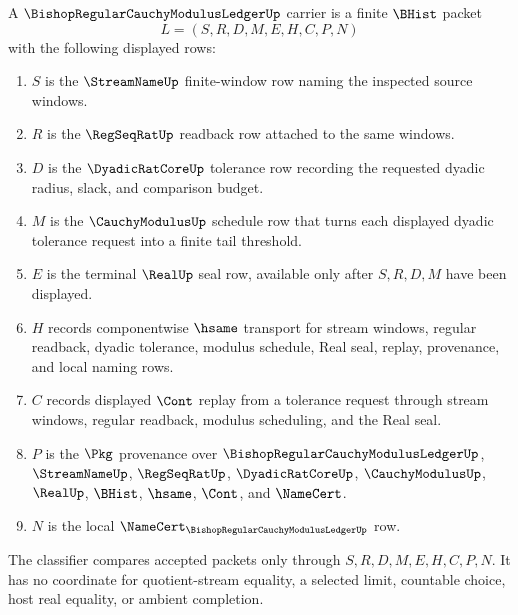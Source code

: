 \begin{definition}
\label{def:bishop-regular-cauchy-modulus-ledger-carrier}
A $\BishopRegularCauchyModulusLedgerUp$ carrier is a finite $\BHist$ packet
$$
L=(S,R,D,M,E,H,C,P,N)
$$
with the following displayed rows:
\begin{enumerate}
\item $S$ is the $\StreamNameUp$ finite-window row naming the inspected source windows.
\item $R$ is the $\RegSeqRatUp$ readback row attached to the same windows.
\item $D$ is the $\DyadicRatCoreUp$ tolerance row recording the requested dyadic radius, slack, and comparison budget.
\item $M$ is the $\CauchyModulusUp$ schedule row that turns each displayed dyadic tolerance request into a finite tail threshold.
\item $E$ is the terminal $\RealUp$ seal row, available only after $S,R,D,M$ have been displayed.
\item $H$ records componentwise $\hsame$ transport for stream windows, regular readback, dyadic tolerance, modulus schedule, Real seal, replay, provenance, and local naming rows.
\item $C$ records displayed $\Cont$ replay from a tolerance request through stream windows, regular readback, modulus scheduling, and the Real seal.
\item $P$ is the $\Pkg$ provenance over $\BishopRegularCauchyModulusLedgerUp$, $\StreamNameUp$, $\RegSeqRatUp$, $\DyadicRatCoreUp$, $\CauchyModulusUp$, $\RealUp$, $\BHist$, $\hsame$, $\Cont$, and $\NameCert$.
\item $N$ is the local $\NameCert_{\BishopRegularCauchyModulusLedgerUp}$ row.
\end{enumerate}
The classifier compares accepted packets only through $S,R,D,M,E,H,C,P,N$. It has no coordinate for quotient-stream equality, a selected limit, countable choice, host real equality, or ambient completion.
\end{definition}

